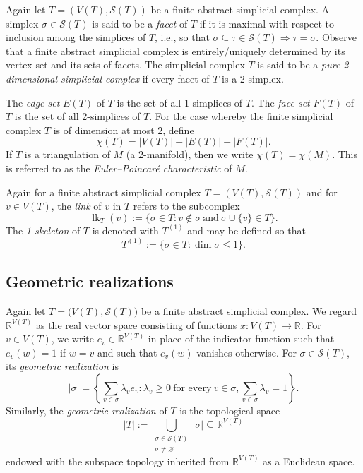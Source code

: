 \documentclass[12pt]{article}
\begin{document}
 Again let $T = (V(T), \mathcal{S}(T))$ be a finite abstract simplicial complex. A simplex $\sigma \in \mathcal{S}(T)$ is said to be a 
 \emph{facet} of $T$ if it is maximal with respect to inclusion among the simplices of $T$, i.e., 
 so that $\sigma \subseteq \tau \in \mathcal{S}(T) \Longrightarrow \tau = \sigma$. 
 Observe that a finite abstract simplicial complex is entirely/uniquely determined by its vertex set and its sets of facets. 
 The simplicial complex $T$ is said to be a \emph{pure 2-dimensional simplicial complex}
 if every facet of $T$ is a $2$-simplex. 

 The \emph{edge set} $E(T)$ of $T$ is the set of all 1-simplices of $T$. The \emph{face set} $F(T)$ of $T$ is the set of all 2-simplices
 of $T$. 
 For the case whereby the finite simplicial complex $T$ is of dimension at most $2$, define 
\begin{equation}\label{EulerPoincare}
 \chi(T) = |V(T)| - |E(T)| + |F(T)|. 
\end{equation}
 If $T$ is a triangulation of $M$ (a 2-manifold), 
 then we write $\chi(T) = \chi(M)$. This is referred to as the \emph{Euler--Poincar\'{e} characteristic} of $M$. 

 Again for a finite abstract simplicial complex $T = (V(T), \mathcal{S}(T))$ and for $v \in V(T)$, the \emph{link} of $v$ in $T$
 refers to the subcomplex
\begin{equation}\label{definelk} 
 \operatorname{lk}_{T}(v) := \{ \sigma \in T : v \not\in \sigma \ \text{and} \ \sigma \cup \{ v \} \in T \}. 
\end{equation}
 The \emph{1-skeleton} of $T$ is denoted with $T^{(1)}$
 and may be defined so that 
\begin{equation}\label{defineskeleton}
 T^{(1)} := \{ \sigma \in T : \dim \sigma \leq 1 \}. 
\end{equation}

\subsection{Geometric realizations}
 Again let $T = \big( V(T), \mathcal{S}(T) \big)$ be a finite abstract simplicial complex. 
 We regard $\mathbb{R}^{V(T)}$ as the real vector space consisting of functions $x\colon V(T) \to \mathbb{R}$.
 For $v \in V(T)$, we write $e_{v} \in \mathbb{R}^{V(T)}$
 in place of the indicator function such that $e_{v}(w) = 1$ if $w = v$ and such that 
 $e_{v}(w)$ vanishes otherwise. For $\sigma \in \mathcal{S}(T)$, its \emph{geometric realization} is 
 $$ \left| \sigma \right| 
 = \left\{ \sum_{v \in \sigma} \lambda_{v} e_{v} : \lambda_{v} \geq 0 \ \text{for every} \ v \in \sigma, 
 \sum_{v \in \sigma} \lambda_{v} = 1 \right\}. $$
 Similarly, the \emph{geometric realization} of $T$ is the topological space
 $$ |T| := \bigcup_{\substack{\sigma \in \mathcal{S}(T) \\ \sigma \neq \varnothing }} 
 \left| \sigma \right| \subseteq \mathbb{R}^{V(T)} $$
 endowed with the subspace topology
 inherited from $\mathbb{R}^{V(T)}$ as a Euclidean space. 
\end{document}
